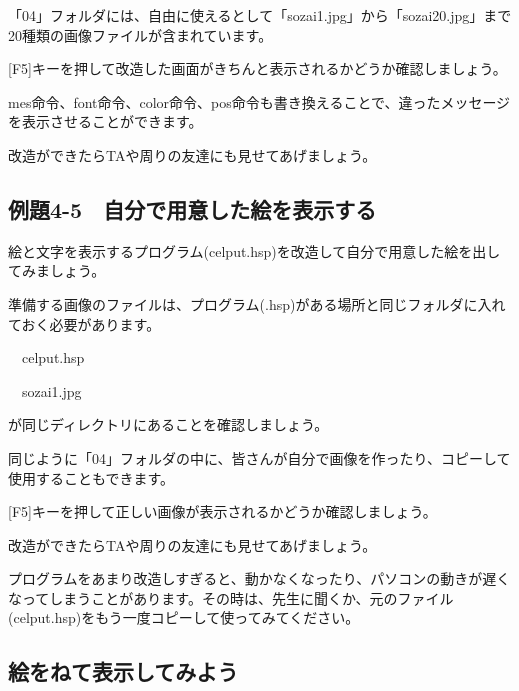 「04」フォルダには、自由に使えるとして「sozai1.jpg」から「sozai20.jpg」まで20種類の画像ファイルが含まれています。

[F5]キーを押して改造した画面がきちんと表示されるかどうか確認しましょう。

mes命令、font命令、color命令、pos命令も書き換えることで、違ったメッセージを表示させることができます。

改造ができたらTAや周りの友達にも見せてあげましょう。


\newpage
\subsection{例題4-5　自分で用意した絵を表示する}

\begin{description}
    \item {}
\end{description}


絵と文字を表示するプログラム(celput.hsp)を改造して自分で用意した絵を出してみましょう。

準備する画像のファイルは、プログラム(.hsp)がある場所と同じフォルダに入れておく必要があります。

\ \ celput.hsp

\ \ sozai1.jpg

が同じディレクトリにあることを確認しましょう。

同じように「04」フォルダの中に、皆さんが自分で画像を作ったり、コピーして使用することもできます。

\begin{description}
    \item {}
\end{description}


[F5]キーを押して正しい画像が表示されるかどうか確認しましょう。

改造ができたらTAや周りの友達にも見せてあげましょう。

プログラムをあまり改造しすぎると、動かなくなったり、パソコンの動きが遅くなってしまうことがあります。その時は、先生に聞くか、元のファイル(celput.hsp)をもう一度コピーして使ってみてください。


\newpage
\subsection{絵をねて表示してみよう}


